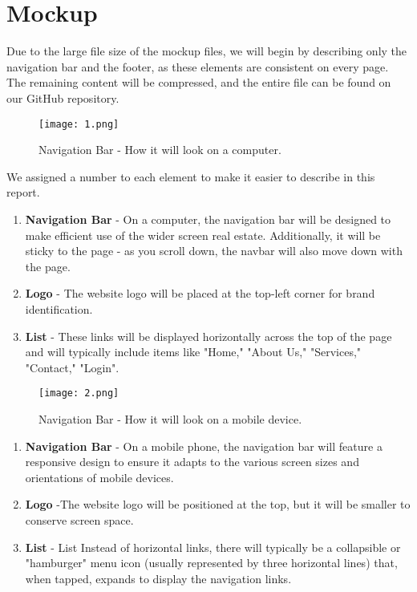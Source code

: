 \documentclass{article}
\begin{document}
    \section{Mockup}

Due to the large file size of the mockup files, we will begin by describing only the navigation bar and the footer, as these elements are consistent on every page. The remaining content will be compressed, and the entire file can be found on our GitHub repository.

\begin{figure}
    \centering
    \texttt{[image: 1.png]}
    \caption{Navigation Bar - How it will look on a computer.}
    \label{fig:enter-label}
\end{figure}

We assigned a number to each element to make it easier to describe in this report.

\begin{enumerate}
    \item \textbf{Navigation Bar} - On a computer, the navigation bar will be designed to make efficient use of the wider screen real estate. Additionally, it will be sticky to the page - as you scroll down, the navbar will also move down with the page.
    \item \textbf{Logo} - The website logo will be placed at the top-left corner for brand identification.
    \item \textbf{List} - These links will be displayed horizontally across the top of the page and will typically include items like "Home," "About Us," "Services," "Contact," "Login".
\end{enumerate}

\begin{figure}[h]
    \centering
    \texttt{[image: 2.png]}
    \caption{Navigation Bar - How it will look on a mobile device.}
    \label{fig:enter-label}
\end{figure}

\begin{enumerate}
    \item \textbf{Navigation Bar} - On a mobile phone, the navigation bar will feature a responsive design to ensure it adapts to the various screen sizes and orientations of mobile devices.
    \item \textbf{Logo} -The website logo will be positioned at the top, but it will be smaller to conserve screen space.
    \item \textbf{List} - List Instead of horizontal links, there will typically be a collapsible or "hamburger" menu icon (usually represented by three horizontal lines) that, when tapped, expands to display the navigation links.
\end{enumerate}
\end{document}
